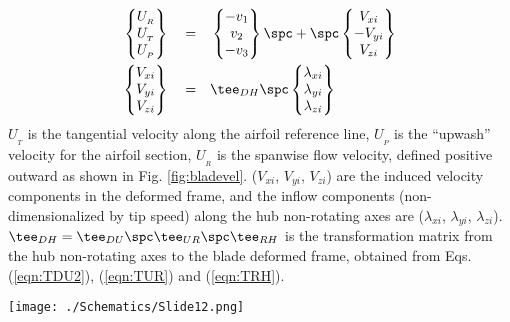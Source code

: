 \begin{align*}
\begin{Bmatrix} U_{_R} \\ U_{_T} \\ U_{_P} \end{Bmatrix} \quad = \quad & \begin{Bmatrix} -v_1 \\ v_2 \\ -v_3 \end{Bmatrix} \spc + \spc \begin{Bmatrix} V_{xi} \\-V_{yi} \\ V_{zi} \end{Bmatrix} \\
\begin{Bmatrix} V_{xi} \\ V_{yi} \\ V_{zi} \end{Bmatrix} \quad = \quad & \tee_{DH} \spc \begin{Bmatrix} \lambda_{xi} \\ \lambda_{yi} \\ \lambda_{zi} \end{Bmatrix}
\end{align*}
$U_{_T}$ is the tangential velocity along the airfoil reference line, $U_{_P}$ is the ``upwash'' velocity for the airfoil section, $U_{_R}$ is the spanwise flow velocity, defined positive outward as shown in Fig. \ref{fig:bladevel}. ($V_{xi}$, $V_{yi}$, $V_{zi}$) are the induced velocity components in the deformed frame, and the inflow components (non-dimensionalized by tip speed) along the hub non-rotating axes are ($\lambda_{xi}$, $\lambda_{yi}$, $\lambda_{zi}$). $\tee_{DH}=\tee_{DU} \spc \tee_{UR} \spc \tee_{RH}$ is the transformation matrix from the hub non-rotating axes to the blade deformed frame, obtained from Eqs. (\ref{eqn:TDU2}), (\ref{eqn:TUR}) and (\ref{eqn:TRH}). 
\begin{Figure}
 \centering
 \texttt{[image: ./Schematics/Slide12.png]}
 \vspace{-0.5cm}
 \label{fig:bladevel}
\end{Figure}
